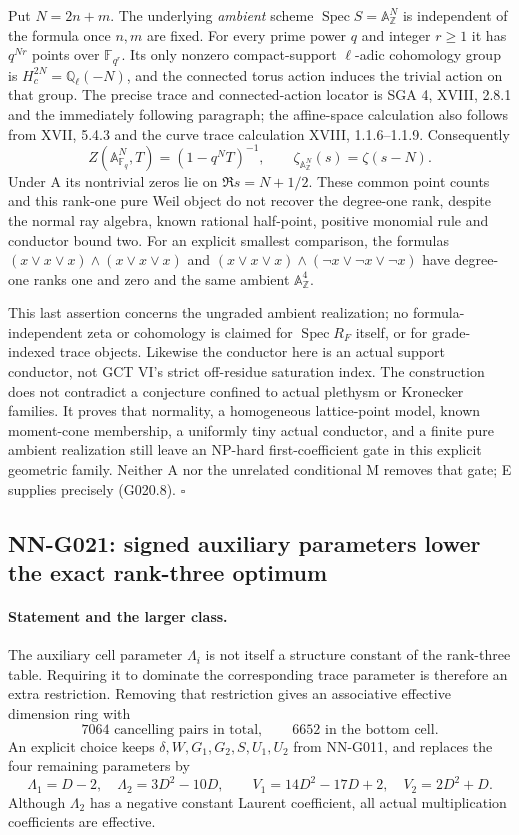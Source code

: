 Put $N=2n+m$. The underlying \emph{ambient} scheme
$\operatorname{Spec}S=\mathbb A^N_{\mathbb Z}$ is independent of
the formula once $n,m$ are fixed. For every prime power $q$ and
integer $r\geq1$ it has $q^{Nr}$ points over $\mathbb F_{q^r}$.
Its only nonzero compact-support $\ell$-adic cohomology group
is $H_c^{2N}=\mathbb Q_\ell(-N)$, and the connected torus action
induces the trivial action on that group. The precise trace and
connected-action locator is SGA 4, XVIII, 2.8.1 and the immediately
following paragraph; the affine-space calculation also follows
from XVII, 5.4.3 and the curve trace calculation XVIII, 1.1.6--1.1.9.
Consequently
\[
 Z(\mathbb A^N_{\mathbb F_q},T)=(1-q^NT)^{-1},\qquad
 \zeta_{\mathbb A^N_{\mathbb Z}}(s)=\zeta(s-N).
 \tag{G020.9}
\]
Under A its nontrivial zeros lie on $\Re s=N+1/2$. These common
point counts and this rank-one pure Weil object do not recover
the degree-one rank, despite the normal ray algebra, known rational
half-point, positive monomial rule and conductor bound two.
For an explicit smallest comparison, the formulas
$(x\vee x\vee x)\wedge(x\vee x\vee x)$ and
$(x\vee x\vee x)\wedge(\neg x\vee\neg x\vee\neg x)$
have degree-one ranks one and zero and the same ambient
$\mathbb A^4_{\mathbb Z}$.

This last assertion concerns the ungraded ambient realization;
no formula-independent zeta or cohomology is claimed for
$\operatorname{Spec}R_F$ itself, or for grade-indexed trace objects.
Likewise the conductor here is an actual support conductor,
not GCT VI's strict off-residue saturation index. The construction
does not contradict a conjecture confined to actual plethysm or
Kronecker families. It proves that normality, a homogeneous
lattice-point model, known moment-cone membership, a uniformly
tiny actual conductor, and a finite pure ambient realization
still leave an NP-hard first-coefficient gate in this explicit
geometric family. Neither A nor the unrelated conditional M
removes that gate; E supplies precisely (G020.8).
\hfill$\square$

\subsection{NN-G021: signed auxiliary parameters lower the exact rank-three optimum}
\paragraph{Statement and the larger class.}
The auxiliary cell parameter $\Lambda_i$ is not itself a structure
constant of the rank-three table. Requiring it to dominate the
corresponding trace parameter is therefore an extra restriction.
Removing that restriction gives an associative effective dimension
ring with
\[
 7064\text{ cancelling pairs in total},\qquad
 6652\text{ in the bottom cell}.                         \tag{G021.1}
\]
An explicit choice keeps $\delta,W,G_1,G_2,S,U_1,U_2$ from NN-G011,
and replaces the four remaining parameters by
\[
 \Lambda_1=D-2,\quad \Lambda_2=3D^2-10D,\qquad
 V_1=14D^2-17D+2,\quad V_2=2D^2+D.                      \tag{G021.2}
\]
Although $\Lambda_2$ has a negative constant Laurent coefficient,
all actual multiplication coefficients are effective.


